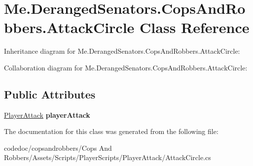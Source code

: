 \hypertarget{classMe_1_1DerangedSenators_1_1CopsAndRobbers_1_1AttackCircle}{}\section{Me.\+Deranged\+Senators.\+Cops\+And\+Robbers.\+Attack\+Circle Class Reference}
\label{classMe_1_1DerangedSenators_1_1CopsAndRobbers_1_1AttackCircle}


Inheritance diagram for Me.\+Deranged\+Senators.\+Cops\+And\+Robbers.\+Attack\+Circle\+:


Collaboration diagram for Me.\+Deranged\+Senators.\+Cops\+And\+Robbers.\+Attack\+Circle\+:
\subsection*{Public Attributes}
\begin{DoxyCompactItemize}
\item 
\mbox{\label{classMe_1_1DerangedSenators_1_1CopsAndRobbers_1_1AttackCircle_abcb4eb72e4357ace42e306ac5d369363}} 
\hyperlink{classMe_1_1DerangedSenators_1_1CopsAndRobbers_1_1PlayerAttack}{Player\+Attack} {\bfseries player\+Attack}
\end{DoxyCompactItemize}


The documentation for this class was generated from the following file\+:\begin{DoxyCompactItemize}
\item 
codedoc/copsandrobbers/\+Cops And Robbers/\+Assets/\+Scripts/\+Player\+Scripts/\+Player\+Attack/Attack\+Circle.\+cs\end{DoxyCompactItemize}
